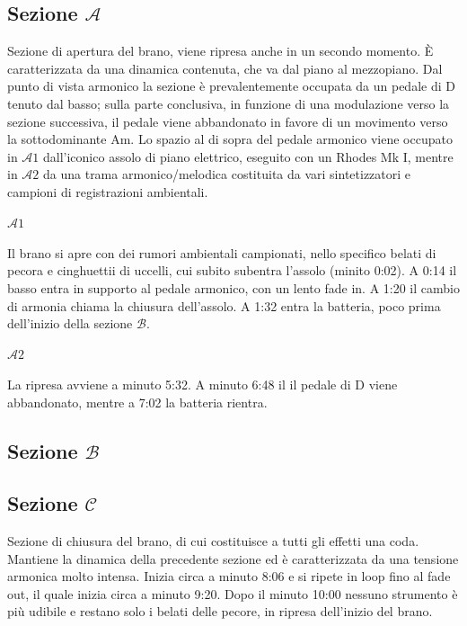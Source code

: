\documentclass[class=book, crop=false, oneside, 12pt]{standalone}
\begin{document}
    \subsection*{Sezione \(\mathcal{A}\)}
    Sezione di apertura del brano, viene ripresa anche in un secondo momento. È caratterizzata da una dinamica contenuta, che va dal piano al mezzopiano. Dal punto di vista armonico la sezione è prevalentemente occupata da un pedale di D tenuto dal basso; sulla parte conclusiva, in funzione di una modulazione verso la sezione successiva, il pedale viene abbandonato in favore di un movimento verso la sottodominante Am. Lo spazio al di sopra del pedale armonico viene occupato in \(\mathcal{A}1\) dall'iconico assolo di piano elettrico, eseguito con un Rhodes Mk I, mentre in \(\mathcal{A}2\) da una trama armonico/melodica costituita da vari sintetizzatori e campioni di registrazioni ambientali.

    
    \paragraph{\(\mathcal{A}1\)} 
    Il brano si apre con dei rumori ambientali campionati, nello specifico belati di pecora e cinghuettii di uccelli, cui subito  subentra l'assolo (minito 0:02). A 0:14 il basso entra in supporto al pedale armonico, con un lento fade in. A 1:20 il cambio di armonia chiama la chiusura dell'assolo. A 1:32 entra la batteria, poco prima dell'inizio della sezione \(\mathcal{B}\).

    \paragraph{\(\mathcal{A}2\)} 
    La ripresa avviene a minuto 5:32. A minuto 6:48 il il pedale di D viene abbandonato, mentre a 7:02 la batteria rientra.

    \subsection*{Sezione \(\mathcal{B}\)}

    
    \subsection*{Sezione \(\mathcal{C}\)}
    Sezione di chiusura del brano, di cui costituisce a tutti gli effetti una coda. Mantiene la dinamica della precedente sezione ed è caratterizzata da una tensione armonica molto intensa. Inizia circa a minuto 8:06 e si ripete in loop fino al fade out, il quale inizia circa a minuto 9:20. Dopo il minuto 10:00 nessuno strumento è più udibile e restano solo i belati delle pecore, in ripresa dell'inizio del brano.
    
\end{document}
